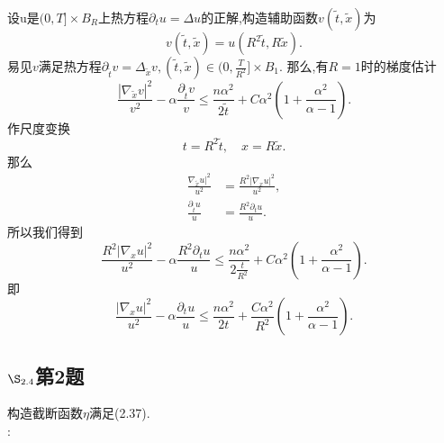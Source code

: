 \documentclass[12pt, a4paper]{ctexbook}
\begin{document}
    设u是$(0,T]\times B_R$上热方程$\partial_t u =\Delta u$的正解,构造辅助函数$v(\tilde{t},\tilde{x})$为
    \begin{equation*}
    v(\tilde{t},\tilde{x}) = u(R^2 \tilde{t},R\tilde{x}).
    \end{equation*}
    易见$v$满足热方程$\partial_{\tilde{t}} v =\Delta_{\tilde{x}} v,(\tilde{t},\tilde{x})\in (0,\frac{T}{R^2}]\times B_1$.
    那么,有$R=1$时的梯度估计
    \begin{equation*}
    \frac{|\nabla_{\tilde{x}}v|^2}{v^2}-\alpha \frac{\partial_{\tilde{t}}v}{v} \le \frac{n\alpha^2}{2\tilde{t}}+C\alpha^2(1+\frac{\alpha^2}{\alpha-1}).
    \end{equation*}
    作尺度变换
    \begin{equation}
    t = R^2 \tilde{t},\quad x = R \tilde{x}.
    \end{equation}
    那么
    \begin{align*}
    \frac{\nabla_{\tilde{x}}u|^2}{u^2} &= \frac{R^2|\nabla_{x}u|^2}{u^2},\\
    \frac{\partial_{\tilde{t}}u}{u} &=
    \frac{R^2\partial_{t}u}{u}.
    \end{align*}
    所以我们得到
    \begin{equation*}
    \frac{R^2|\nabla_{x}u|^2}{u^2} - \alpha\frac{R^2\partial_{t}u}{u} \le \frac{n\alpha^2}{2\frac{t}{R^2}}+C\alpha^2(1+\frac{\alpha^2}{\alpha-1}).
    \end{equation*}
    即
    \begin{equation*}
    \frac{|\nabla_{x}u|^2}{u^2} - \alpha\frac{\partial_{t}u}{u} \le \frac{n\alpha^2}{2t}+\frac{C\alpha^2}{R^2}(1+\frac{\alpha^2}{\alpha-1}).
    \end{equation*}
    
    \subsection{$\S_{2.4}$第2题}
    \kaishu{}构造截断函数$\eta$满足(2.37).     \\
    
    \songti{}:\\
    
\end{document}
